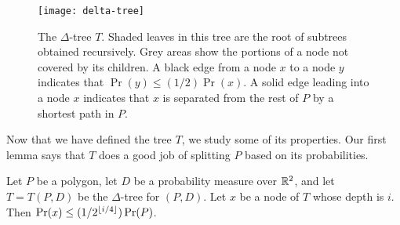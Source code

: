 \documentclass[lotsofwhite]{patmorin}
\begin{document}
\begin{figure}
 \begin{center}\texttt{[image: delta-tree]}\end{center}
   \caption{The $\Delta$-tree $T$.  Shaded leaves in this tree are the
     root of subtrees obtained recursively.  Grey areas show the
portions of a node not covered by its children. 
A black edge from a node $x$ to a node $y$ indicates that $\Pr(y)\le
(1/2)\Pr(x)$.  A solid edge leading into a node $x$ indicates that $x$
is separated from the rest of $P$ by a shortest path in $P$.}
\end{figure}

Now that we have defined the tree $T$, we study some of its
properties.  Our first lemma says that $T$ does a good job of
splitting $P$ based on its probabilities.

\begin{lem}
Let $P$ be a polygon, let $D$ be a probability measure over $\mathbb{R}^2$, 
and let $T=T(P,D)$ be the $\Delta$-tree for $(P,D)$.
Let $x$ be a node of $T$ whose depth is $i$. Then $\Pr(x) \le
(1/2^{{\left\lfloor i/4 \right\rfloor}})\Pr(P)$.
\end{lem}
\end{document}
